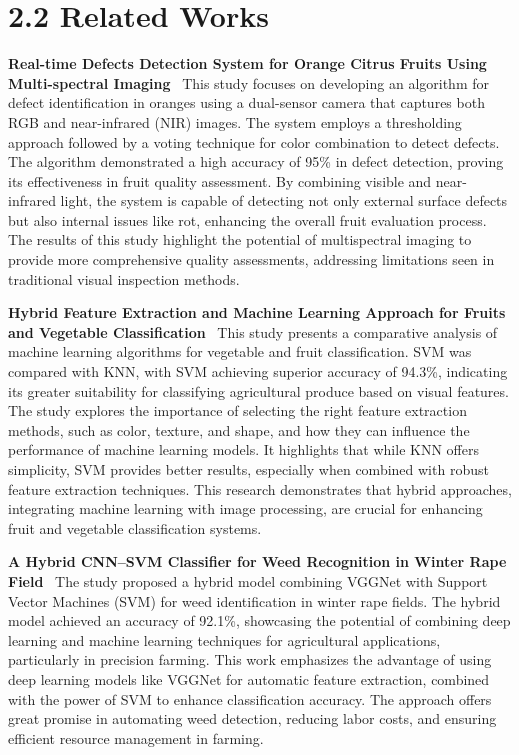 \documentclass[12pt,a4paper]{report}
\begin{document}
	\section*{2.2 Related Works}

	\textbf{Real-time Defects Detection System for Orange Citrus Fruits Using Multi-spectral Imaging} \ This study focuses on developing an algorithm for defect identification in oranges using a dual-sensor camera that captures both RGB and near-infrared (NIR) images. The system employs a thresholding approach followed by a voting technique for color combination to detect defects. The algorithm demonstrated a high accuracy of 95\% in defect detection, proving its effectiveness in fruit quality assessment. By combining visible and near-infrared light, the system is capable of detecting not only external surface defects but also internal issues like rot, enhancing the overall fruit evaluation process. The results of this study highlight the potential of multispectral imaging to provide more comprehensive quality assessments, addressing limitations seen in traditional visual inspection methods\cite{ref1}.
	
	\vspace*{0.8cm} \textbf{Hybrid Feature Extraction and Machine Learning Approach for Fruits and Vegetable Classification} \ This study presents a comparative analysis of machine learning algorithms for vegetable and fruit classification. SVM was compared with KNN, with SVM achieving superior accuracy of 94.3\%, indicating its greater suitability for classifying agricultural produce based on visual features. The study explores the importance of selecting the right feature extraction methods, such as color, texture, and shape, and how they can influence the performance of machine learning models. It highlights that while KNN offers simplicity, SVM provides better results, especially when combined with robust feature extraction techniques. This research demonstrates that hybrid approaches, integrating machine learning with image processing, are crucial for enhancing fruit and vegetable classification systems\cite{ref2}.
	
	\vspace*{0.8cm} \textbf{A Hybrid CNN–SVM Classifier for Weed Recognition in Winter Rape Field} \ The study proposed a hybrid model combining VGGNet with Support Vector Machines (SVM) for weed identification in winter rape fields. The hybrid model achieved an accuracy of 92.1\%, showcasing the potential of combining deep learning and machine learning techniques for agricultural applications, particularly in precision farming. This work emphasizes the advantage of using deep learning models like VGGNet for automatic feature extraction, combined with the power of SVM to enhance classification accuracy. The approach offers great promise in automating weed detection, reducing labor costs, and ensuring efficient resource management in farming\cite{ref3}.
	
\end{document}
